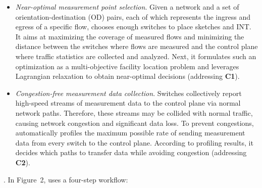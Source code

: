 \begin{itemize}[leftmargin=*]
%
    \item \emph{Near-optimal measurement point selection}. Given a network and a set of orientation-destination (OD) pairs, each of which represents the ingress and egress of a specific flow, \sysname chooses enough switches to place sketches and INT. It aims at maximizing the coverage of measured flows and minimizing the distance between the switches where flows are measured and the control plane where traffic statistics are collected and analyzed. Next, it formulates such an optimization as a multi-objective facility location problem and leverages Lagrangian relaxation to obtain near-optimal decisions (addressing \textbf{C1}). 
%
%
    \item \emph{Congestion-free measurement data collection}. Switches collectively report high-speed streams of measurement data to the control plane via normal network paths. Therefore, these streams may be collided with normal traffic, causing network congestion and significant data loss. To prevent congestions, \sysname automatically profiles the maximum possible rate of sending measurement data from every switch to the control plane. According to profiling results, it decides which paths to transfer data while avoiding congestion (addressing \textbf{C2}). 
%
\end{itemize}

. In Figure~2, \sysname uses a four-step workflow:

